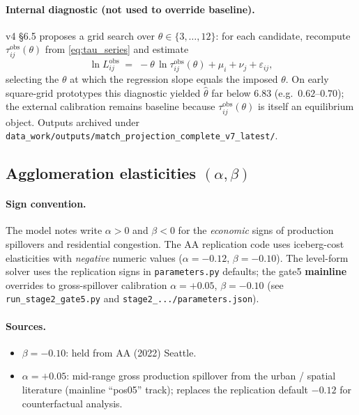 \documentclass[11pt]{article}
\newcommand{\obs}{\mathrm{obs}}
\begin{document}
\paragraph{Internal diagnostic (not used to override baseline).}
v4 \S6.5 proposes a grid search over
$\theta\in\{3,\ldots,12\}$: for each candidate, recompute
$\tau^{\obs}_{ij}(\theta)$ from \eqref{eq:tau_series} and estimate
\begin{equation}\label{eq:gravity_log}
  \ln L^{\obs}_{ij}
  \;=\;
  -\theta\,\ln\tau^{\obs}_{ij}(\theta) + \mu_i + \nu_j + \varepsilon_{ij},
\end{equation}
selecting the $\theta$ at which the regression slope equals the imposed
$\theta$.  On early square-grid prototypes this diagnostic yielded
$\hat\theta$ far below $6.83$ (e.g.\ $0.62$--$0.70$); the external
calibration remains baseline because $\tau^{\obs}_{ij}(\theta)$ is itself
an equilibrium object.  Outputs archived under
\texttt{data\_work/outputs/match\_projection\_complete\_v7\_latest/}.

\subsection{Agglomeration elasticities $(\alpha,\beta)$}

\paragraph{Sign convention.}
The model notes write $\alpha>0$ and $\beta<0$ for the \emph{economic}
signs of production spillovers and residential congestion.  The AA
replication code uses iceberg-cost elasticities with \emph{negative}
numeric values ($\alpha=-0.12$, $\beta=-0.10$).  The level-form solver
uses the replication signs in \texttt{parameters.py} defaults; the
gate5 \textbf{mainline} overrides to gross-spillover calibration
$\alpha=+0.05$, $\beta=-0.10$ (see \texttt{run\_stage2\_gate5.py} and
\texttt{stage2\_.../parameters.json}).

\paragraph{Sources.}
\begin{itemize}[leftmargin=2em]
  \item $\beta=-0.10$: held from AA (2022) Seattle.
  \item $\alpha=+0.05$: mid-range gross production spillover from the
        urban / spatial literature (mainline ``pos05'' track); replaces
        the replication default $-0.12$ for counterfactual analysis.
\end{itemize}
\end{document}
